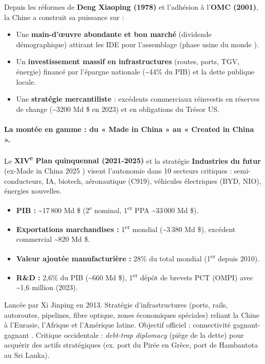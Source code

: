 \documentclass[11pt]{article}
\begin{document}
Depuis les réformes de \textbf{Deng Xiaoping (1978)} et l'adhésion à l'\textbf{OMC (2001)}, la Chine a construit sa puissance sur :
\begin{itemize}
    \item Une \textbf{main-d'œuvre abondante et bon marché} (dividende démographique) attirant les IDE pour l'assemblage (phase \og usine du monde \fg).
    \item Un \textbf{investissement massif en infrastructures} (routes, ports, TGV, énergie) financé par l'épargne nationale (\textasciitilde 44\% du PIB) et la dette publique locale.
    \item Une \textbf{stratégie mercantiliste} : excédents commerciaux réinvestis en réserves de change (\textasciitilde \num{3200} Md \$ en 2023) et en obligations du Trésor US.
\end{itemize}

\paragraph{La montée en gamme : du « Made in China » au « Created in China ».}
Le \textbf{XIV\textsuperscript{e} Plan quinquennal (2021-2025)} et la stratégie \textbf{\og Industries du futur \fg} (ex-\og Made in China 2025 \fg) visent l'autonomie dans 10 secteurs critiques : semi-conducteurs, IA, biotech, aéronautique (C919), véhicules électriques (BYD, NIO), énergies nouvelles.
\begin{exemplebox}
\begin{itemize}
    \item \textbf{PIB :} \textasciitilde 17\,800 Md \$ (2\textsuperscript{e} nominal, 1\textsuperscript{er} PPA \textasciitilde 33\,000 Md \$).
    \item \textbf{Exportations marchandises :} 1\textsuperscript{er} mondial (\textasciitilde 3\,380 Md \$), excédent commercial \textasciitilde 820 Md \$.
    \item \textbf{Valeur ajoutée manufacturière :} 28\% du total mondial (1\textsuperscript{er} depuis 2010).
    \item \textbf{R\&D :} 2,6\% du PIB (\textasciitilde 660 Md \$), 1\textsuperscript{er} dépôt de brevets PCT (OMPI) avec \textasciitilde 1,6 million (2023).
\end{itemize}
\end{exemplebox}

\begin{definition}
Lancée par Xi Jinping en 2013. Stratégie d'infrastructures (ports, rails, autoroutes, pipelines, fibre optique, zones économiques spéciales) reliant la Chine à l'Eurasie, l'Afrique et l'Amérique latine. Objectif officiel : \og connectivité gagnant-gagnant \fg. Critique occidentale : \og \emph{debt-trap diplomacy} \fg{} (piège de la dette) pour acquérir des actifs stratégiques (ex. port du Pirée en Grèce, port de Hambantota au Sri Lanka).
\end{definition}
\end{document}
